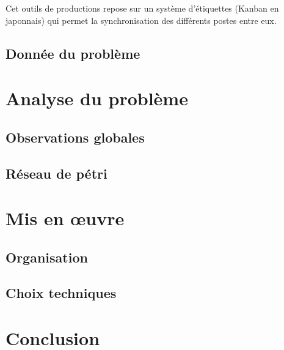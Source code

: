 \documentclass[11pt]{report}
\begin{document}
	Cet outils de productions repose sur un système d'étiquettes (Kanban en japonnais) qui permet la synchronisation des différents postes entre eux. 
	\section{Donnée du problème}
	
\chapter{Analyse du problème}

	\section{Observations globales}
	
	\section{Réseau de pétri}
		
\chapter{Mis en \oe{}uvre}

	\section{Organisation}
	
	\section{Choix techniques}
	
\chapter{Conclusion}
\end{document}
